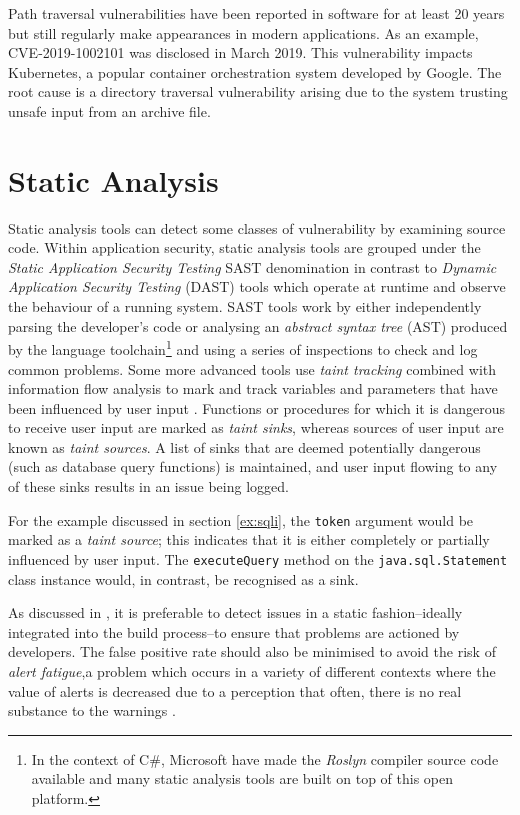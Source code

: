 Path traversal vulnerabilities have been reported in software for at least 20 years but still regularly make appearances
in modern applications.
As an example, CVE-2019-1002101 was disclosed in March 2019.
This vulnerability impacts Kubernetes, a popular container orchestration system developed by Google.
The root cause is a directory traversal vulnerability arising due to the system trusting unsafe input from an archive
file.

\section{Static Analysis}

Static analysis tools can detect some classes of vulnerability by examining source code.
Within application security, static analysis tools are grouped under the \emph{Static Application Security Testing} SAST
denomination in contrast to \emph{Dynamic Application Security Testing} (DAST) tools which operate at runtime and
observe the behaviour of a running system.
SAST tools work by either independently parsing the developer's code or
analysing an \emph{abstract syntax tree} (AST) produced by the language toolchain\footnote{%
    In the context of C\#, Microsoft have made the \emph{Roslyn} compiler source code available and many static analysis
    tools are built on top of this open platform.}
and using a series of inspections to check and log common problems.
Some more advanced tools use \emph{taint tracking} combined with information flow analysis to mark and track variables
and parameters that have been influenced by user input \citep{denning1977certification}.
Functions or procedures for which it is dangerous to receive user input are marked as \emph{taint sinks}, whereas
sources of user input are known as \emph{taint sources}.
A list of sinks that are deemed potentially dangerous (such as database query functions) is maintained, and user input
flowing to any of these sinks results in an issue being logged.

For the example discussed in section \ref{ex:sqli}, the \texttt{token} argument would be marked as a
\emph{taint source}; this indicates that it is either completely or partially influenced by user input.
The \texttt{executeQuery} method on the \texttt{java.sql.Statement} class instance would, in contrast, be recognised
as a sink.

As discussed in \citet{sadowski2018lessons}, it is preferable to detect issues in a static fashion--ideally integrated
into the build process--to ensure that problems are actioned by developers.
The false positive rate should also be minimised to avoid the risk of \emph{alert fatigue},a problem which occurs in a
variety of different contexts where the value of alerts is decreased due to a perception that often, there is no real
substance to the warnings \citep{kesselheim2011clinical}.

